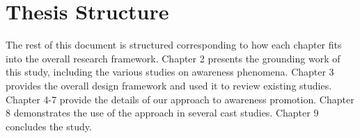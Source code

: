 
\section{Thesis Structure} %
\label{sec:thesis_structure}
The rest of this document is structured corresponding to how each chapter fits into the overall research framework. Chapter 2 presents the grounding work of this study, including the various studies on awareness phenomena. Chapter 3 provides the overall design framework and used it to review existing studies. Chapter 4-7 provide the details of our approach to awareness promotion. Chapter 8 demonstrates the use of the approach in several cast studies. Chapter 9 concludes the study.
